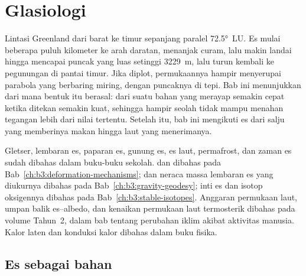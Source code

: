 \chapter{Glasiologi}\label{ch:b3:glaciology}

Lintasi Greenland dari barat ke timur sepanjang paralel \ang{72.5}~LU. Es
mulai beberapa puluh kilometer ke arah daratan, menanjak curam, lalu makin
landai hingga mencapai puncak yang luas setinggi \qty{3229}{m}, lalu turun
kembali ke pegunungan di pantai timur. Jika diplot, permukaannya hampir
menyerupai parabola yang berbaring miring, dengan puncaknya di tepi. Bab ini
menunjukkan dari mana bentuk itu berasal: dari suatu bahan yang merayap
semakin cepat ketika ditekan semakin kuat, sehingga hampir seolah tidak
mampu menahan tegangan lebih dari nilai tertentu. Setelah itu, bab ini
mengikuti es dari salju yang memberinya makan hingga laut yang menerimanya.

\begin{recall}
Gletser, lembaran es, paparan es, gunung es, es laut, permafrost, dan zaman es
sudah dibahas dalam buku-buku sekolah.  dan  dibahas
pada Bab~\ref{ch:b3:deformation-mechanisms};  dan
neraca massa lembaran es yang diukurnya dibahas pada Bab~\ref{ch:b3:gravity-geodesy};
inti es dan isotop oksigennya dibahas pada Bab~\ref{ch:b3:stable-isotopes}.
Anggaran permukaan laut, umpan balik es--albedo, dan kenaikan permukaan laut
termosterik dibahas pada volume Tahun~2, dalam bab tentang perubahan iklim
akibat aktivitas manusia. Kalor laten dan konduksi kalor dibahas dalam buku fisika.
\end{recall}

\section{Es sebagai bahan}\label{sec:b3:glaciology:material}


